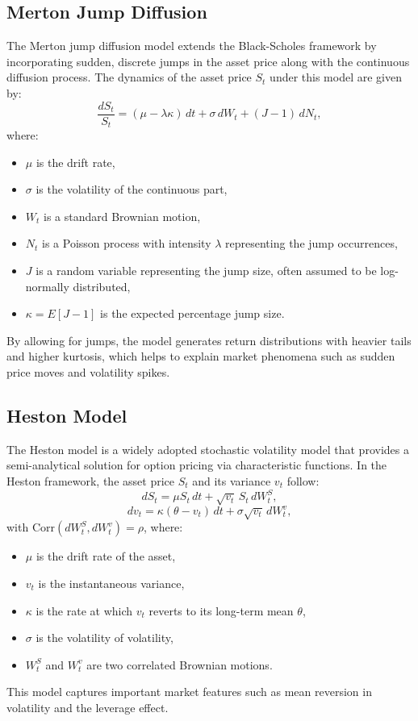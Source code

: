 \documentclass[letterpaper,11pt]{article}
\begin{document}
\subsection{Merton Jump Diffusion}
The Merton jump diffusion model extends the Black-Scholes framework by incorporating sudden, discrete jumps in the asset price along with the continuous diffusion process. The dynamics of the asset price \(S_t\) under this model are given by:
\[
\frac{dS_t}{S_t} = (\mu - \lambda \kappa)\, dt + \sigma\, dW_t + (J-1)\, dN_t,
\]
where:
\begin{itemize}
    \item \(\mu\) is the drift rate,
    \item \(\sigma\) is the volatility of the continuous part,
    \item \(W_t\) is a standard Brownian motion,
    \item \(N_t\) is a Poisson process with intensity \(\lambda\) representing the jump occurrences,
    \item \(J\) is a random variable representing the jump size, often assumed to be log-normally distributed,
    \item \(\kappa = E[J-1]\) is the expected percentage jump size.
\end{itemize}
By allowing for jumps, the model generates return distributions with heavier tails and higher kurtosis, which helps to explain market phenomena such as sudden price moves and volatility spikes.


\subsection{Heston Model}
The Heston model is a widely adopted stochastic volatility model that provides a semi-analytical solution for option pricing via characteristic functions. In the Heston framework, the asset price \(S_t\) and its variance \(v_t\) follow:
\[
dS_t = \mu S_t\, dt + \sqrt{v_t}\, S_t\, dW_t^S,
\]
\[
dv_t = \kappa (\theta - v_t)\, dt + \sigma \sqrt{v_t}\, dW_t^v,
\]
with \(\mathrm{Corr}(dW_t^S,dW_t^v)=\rho\), where:
\begin{itemize}
    \item \(\mu\) is the drift rate of the asset,
    \item \(v_t\) is the instantaneous variance,
    \item \(\kappa\) is the rate at which \(v_t\) reverts to its long-term mean \(\theta\),
    \item \(\sigma\) is the volatility of volatility,
    \item \(W_t^S\) and \(W_t^v\) are two correlated Brownian motions.
\end{itemize}
This model captures important market features such as mean reversion in volatility and the leverage effect.
\end{document}
